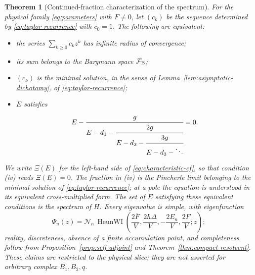 \documentclass[11pt]{article}
\newtheorem{theorem}{Theorem}[section]
\theoremstyle{remark}
\begin{document}
\begin{theorem}[Continued-fraction characterization of the spectrum]
\label{thm:bargmann-characteristic}
For the physical family \eqref{eq:parameters} with \(F\ne0\), let \((c_k)\)
be the sequence determined by \eqref{eq:taylor-recurrence} with \(c_0=1\).
The following are equivalent:
\begin{itemize}
\item[(i)] the series \(\sum_{k\ge0}c_kz^k\) has infinite radius of
 convergence;
\item[(ii)] its sum belongs to the Bargmann space \(\mathcal F_{\rm B}\);
\item[(iii)] \((c_k)\) is the minimal solution, in the sense of
 Lemma~\ref{lem:asymptotic-dichotomy}, of \eqref{eq:taylor-recurrence};
\item[(iv)] \(E\) satisfies
\begin{equation}
 E-\cfrac{g}{
 E-d_1-\cfrac{2g}{
 E-d_2-\cfrac{3g}{
 E-d_3-\ddots}}}=0.
 \label{eq:characteristic-cf}
\end{equation}
\end{itemize}
We write \(\Xi(E)\) for the left-hand side of \eqref{eq:characteristic-cf},
so that condition (iv) reads \(\Xi(E)=0\).
The fraction in (iv) is the Pincherle limit belonging to the minimal
solution of \eqref{eq:taylor-recurrence}; at a pole the equation is
understood in its equivalent cross-multiplied form.  The set of \(E\)
satisfying these equivalent conditions is the spectrum of \(H\).  Every
eigenvalue is simple, with eigenfunction
\begin{equation}
 \Psi_n(z)=\mathcal N_n\,
 \operatorname{HeunWI}\!\left(
 \frac{2\overline F}{V},\frac{2\hbar\Delta}{V},
 -\frac{2E_n}{V},\frac{2F}{V};z\right);
 \label{eq:heunwi-eigenfunction}
\end{equation}
reality, discreteness, absence of a finite accumulation point, and
completeness follow from Proposition~\ref{prop:self-adjoint} and
Theorem~\ref{thm:compact-resolvent}.  These claims are restricted to the physical
slice; they are not asserted for arbitrary complex \(B_1,B_2,q\).
\end{theorem}
\end{document}
